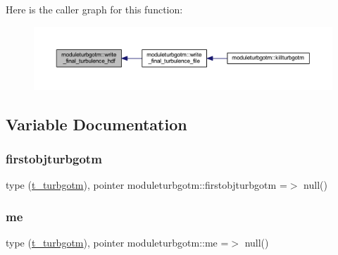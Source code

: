Here is the caller graph for this function\+:\nopagebreak
\begin{figure}[H]
\begin{center}
\leavevmode
\includegraphics[width=350pt]{namespacemoduleturbgotm_afdd63df0733f254a488fb73b240eb944_icgraph}
\end{center}
\end{figure}


\subsection{Variable Documentation}
\mbox{\label{namespacemoduleturbgotm_a16f7125a4269b004133d50c21b100a9d}} 
\subsubsection{\texorpdfstring{firstobjturbgotm}{firstobjturbgotm}}
{\footnotesize\ttfamily type (\mbox{\hyperlink{structmoduleturbgotm_1_1t__turbgotm}{t\+\_\+turbgotm}}), pointer moduleturbgotm\+::firstobjturbgotm =$>$ null()\hspace{0.3cm}{\ttfamily [private]}}

\mbox{\label{namespacemoduleturbgotm_ac86f138c93eff7a297646af1cbe15166}} 
\subsubsection{\texorpdfstring{me}{me}}
{\footnotesize\ttfamily type (\mbox{\hyperlink{structmoduleturbgotm_1_1t__turbgotm}{t\+\_\+turbgotm}}), pointer moduleturbgotm\+::me =$>$ null()\hspace{0.3cm}{\ttfamily [private]}}

